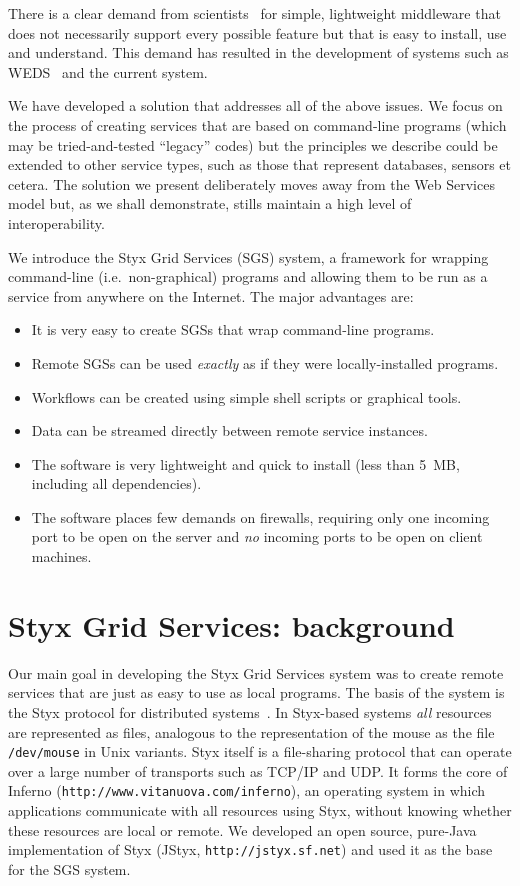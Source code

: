 \documentclass{llncs}
\begin{document}
There is a clear demand from scientists~\cite{chin:2004} for simple, lightweight middleware that does not necessarily support every possible feature but that is easy to install, use and understand.  This demand has resulted in the development of systems such as WEDS~\cite{weds} and the current system.

We have developed a solution that addresses all of the above issues.  We focus on the process of creating services that are based on command-line programs (which may be tried-and-tested ``legacy'' codes) but the principles we describe could be extended to other service types, such as those that represent databases, sensors et cetera.  The solution we present deliberately moves away from the Web Services model but, as we shall demonstrate, stills maintain a high level of interoperability.

We introduce the Styx Grid Services (SGS) system, a framework for wrapping command-line (i.e.\ non-graphical) programs and allowing them to be run as a service from anywhere on the Internet.  The major advantages are:
\begin{itemize}
  \item It is very easy to create SGSs that wrap command-line programs.
	\item Remote SGSs can be used {\em exactly\/} as if they were locally-installed programs.
	\item Workflows can be created using simple shell scripts or graphical tools.
	\item Data can be streamed directly between remote service instances.
	\item The software is very lightweight and quick to install (less than 5~MB, including all dependencies).
	\item The software places few demands on firewalls, requiring only one incoming port to be open on the server and {\em no\/} incoming ports to be open on client machines.
\end{itemize}


\section{Styx Grid Services: background}\label{sec:sgsoverview}
Our main goal in developing the Styx Grid Services system was to create remote services that are just as easy to use as local programs.  The basis of the system is the Styx protocol for distributed systems~\cite{Pike:1999}.  In Styx-based systems {\em all\/} resources
are represented as files, analogous to the representation of the mouse as the file {\tt /dev/mouse} in Unix variants.  Styx itself is a file-sharing protocol that can operate over a large number of transports such as TCP/IP and UDP.  It forms the core of Inferno ({\tt http://www.vitanuova.com/inferno}), an operating system in which applications communicate with all resources using Styx, without knowing whether these resources are local or remote.  We developed an open source, pure-Java implementation of Styx (JStyx, {\tt http://jstyx.sf.net}) and used it as the base for the SGS system.
\end{document}
